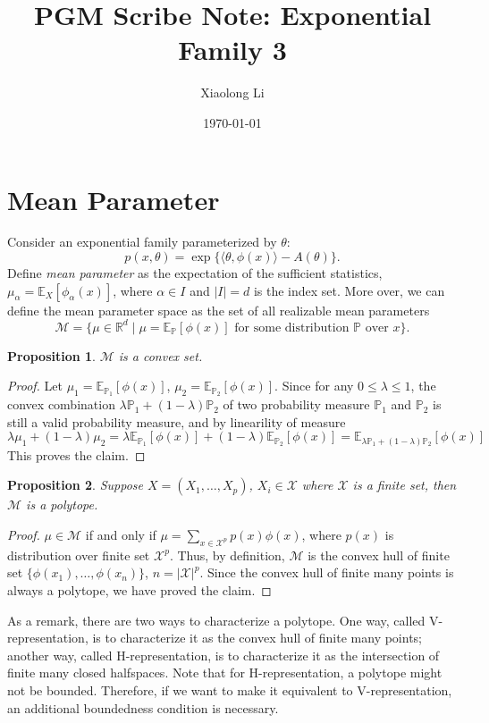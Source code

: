 \documentclass[11pt]{article}
\title{PGM Scribe Note: Exponential Family 3}
\author{Xiaolong Li}
\date{\today}
\newcommand{\Xc}{\mathcal{X}}
\newcommand{\Mc}{\mathcal{M}}
\newcommand{\E}{\mathbb{E}}
\newcommand{\R}{\mathbb{R}}
\newcommand{\prob}{\mathbb{P}}
\newcommand{\1}{\mathbbm{1}}
\newtheorem{prop}{Proposition}
\begin{document}
\maketitle

\section{Mean Parameter}
Consider an exponential family parameterized by $\theta$:
\[
p(x, \theta) = \exp\{\langle \theta, \phi(x) \rangle - A(\theta)\}.
\]
Define \emph{mean parameter} as the expectation of the sufficient statistics,
$\mu_\alpha = \E_X[\phi_\alpha(x)]$, where $\alpha \in I$ and $|I| = d$ is the index set. More
over, we can define the mean parameter space as the set of all realizable mean
parameters
\[
\Mc = \{\mu \in \R^d \; | \; \mu = \E_\prob[\phi(x)] \text{ for some distribution } \prob \text{ over } x\}.
\]

\begin{prop}
$\Mc$ is a convex set.
\end{prop}
\begin{proof}
Let $\mu_1 = \E_{\prob_1}[\phi(x)]$, $\mu_2 = \E_{\prob_2}[\phi(x)]$.
Since for any $0 \leq \lambda \leq 1$, the convex combination $\lambda \prob_1 + (1-\lambda)\prob_2$ of two 
probability measure $\prob_1$ and $\prob_2$ is still a valid probability measure, and by linearility of measure
\[
\lambda \mu_1 + (1-\lambda)\mu_2 = \lambda \E_{\prob_1}[\phi(x)] + (1-\lambda) \E_{\prob_2}[\phi(x)]
= \E_{\lambda \prob_1 + (1-\lambda)\prob_2}[\phi(x)]
\]
This proves the claim.
\end{proof}

\begin{prop}
Suppose $X = (X_1, \ldots, X_p)$, $X_i \in \Xc$ where $\Xc$ is a finite set, then $\Mc$ is a polytope.
\end{prop}
\begin{proof}
$\mu \in \Mc$ if and only if $\mu = \sum_{x \in \Xc^p} p(x)\phi(x)$, where $p(x)$ is distribution over
finite set $\Xc^p$. Thus, by definition, $\Mc$ is the convex hull of finite set
$\{\phi(x_1), \ldots, \phi(x_n)\}$, $n = |\Xc|^p$. Since the convex hull of finite many points is always
a polytope, we have proved the claim.
\end{proof}

As a remark, there are two ways to characterize a polytope. One way, called V-representation, is to characterize
it as the convex hull of finite many points; another way, called H-representation, is to characterize it as
the intersection of finite many closed halfspaces. Note that for H-representation, a polytope might not be
bounded. Therefore, if we want to make it equivalent to V-representation, an additional boundedness condition
is necessary.
\end{document}

